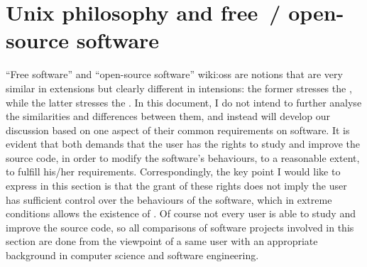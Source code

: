 \section{Unix philosophy and free~/ open-source software}\label{sec:foss}

``Free software'' and ``open-source software''\cupercite%
{wiki:oss} are notions that are very similar in extensions but clearly
different in intensions: the former stresses the , while the latter stresses the
.
In this document, I do not intend to further analyse the similarities and
differences between them, and instead will develop our discussion based on
one aspect of their common requirements on software.  It is evident that both
demands that the user has the rights to study and improve the source code,
in order to modify the software's behaviours, to a reasonable extent, to
fulfill his/her requirements.  Correspondingly, the key point I would like
to express in this section is that the grant of these rights does not imply
the user has sufficient control over the behaviours of the software, which in
extreme conditions allows the existence of .  Of course not every user is able to study and improve the
source code, so all comparisons of software projects involved in this section
are done from the viewpoint of a same user with an appropriate background
in computer science and software engineering.

